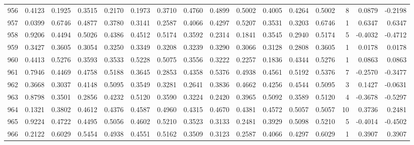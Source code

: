 \begin{tabular}{lrrrrrrrrrrrrrrr}
956 &      0.4123 &  0.1925 &  0.3515 &  0.2170 &  0.1973 &  0.3710 &  0.4760 &  0.4899 &  0.5002 &  0.4005 &   0.4264 &     0.5002 &      8 &                    0.0879 &                    -0.2198 \\
957 &      0.0399 &  0.6746 &  0.4877 &  0.3780 &  0.3141 &  0.2587 &  0.4066 &  0.4297 &  0.5207 &  0.3531 &   0.3203 &     0.6746 &      1 &                    0.6347 &                     0.6347 \\
958 &      0.9206 &  0.4494 &  0.5026 &  0.4386 &  0.4512 &  0.5174 &  0.3592 &  0.2314 &  0.1841 &  0.3545 &   0.2940 &     0.5174 &      5 &                   -0.4032 &                    -0.4712 \\
959 &      0.3427 &  0.3605 &  0.3054 &  0.3250 &  0.3349 &  0.3208 &  0.3239 &  0.3290 &  0.3066 &  0.3128 &   0.2808 &     0.3605 &      1 &                    0.0178 &                     0.0178 \\
960 &      0.4413 &  0.5276 &  0.3593 &  0.3533 &  0.5228 &  0.5075 &  0.3556 &  0.3222 &  0.2257 &  0.1836 &   0.4344 &     0.5276 &      1 &                    0.0863 &                     0.0863 \\
961 &      0.7946 &  0.4469 &  0.4758 &  0.5188 &  0.3645 &  0.2853 &  0.4358 &  0.5376 &  0.4938 &  0.4561 &   0.5192 &     0.5376 &      7 &                   -0.2570 &                    -0.3477 \\
962 &      0.3668 &  0.3037 &  0.4148 &  0.5095 &  0.3549 &  0.3281 &  0.2641 &  0.3836 &  0.4662 &  0.4256 &   0.4544 &     0.5095 &      3 &                    0.1427 &                    -0.0631 \\
963 &      0.8798 &  0.3501 &  0.2856 &  0.4232 &  0.5120 &  0.3590 &  0.3224 &  0.2420 &  0.3965 &  0.5092 &   0.3589 &     0.5120 &      4 &                   -0.3678 &                    -0.5297 \\
964 &      0.1321 &  0.3802 &  0.4612 &  0.4376 &  0.4587 &  0.4960 &  0.4315 &  0.4670 &  0.4381 &  0.4572 &   0.5057 &     0.5057 &     10 &                    0.3736 &                     0.2481 \\
965 &      0.9224 &  0.4722 &  0.4495 &  0.5056 &  0.4602 &  0.5210 &  0.3523 &  0.3133 &  0.2481 &  0.3929 &   0.5098 &     0.5210 &      5 &                   -0.4014 &                    -0.4502 \\
966 &      0.2122 &  0.6029 &  0.5454 &  0.4938 &  0.4551 &  0.5162 &  0.3509 &  0.3123 &  0.2587 &  0.4066 &   0.4297 &     0.6029 &      1 &                    0.3907 &                     0.3907 \\

\end{tabular}
